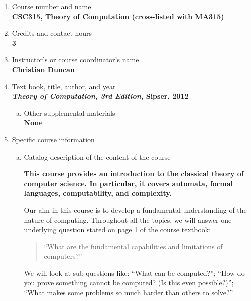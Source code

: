 \label{CSC315}  %
\begin{enumerate}[1.]
\item Course number and name\\
  {\bfseries
    CSC315, Theory of Computation (cross-listed with MA315)
  }
  
\item Credits and contact hours\\
  {\bfseries
    3    
  }

\item Instructor's or course coordinator's name\\
  {\bfseries
    Christian Duncan    
  }

\item Text book, title, author, and year\\
  {\bfseries
    {\em Theory of Computation, 3rd Edition}, Sipser, 2012
  }
\begin{enumerate}[a.]
\item Other supplemental materials\\
  {\bfseries
    None    
  }
\end{enumerate}

\item Specific course information
\begin{enumerate}[a.]  
\item Catalog description of the content of the course\\
  {\bfseries
This course provides an introduction to the classical theory of computer science.
In particular, it covers automata, formal languages, computability, and complexity.

Our aim in this course is to develop a fundamental understanding of the nature of computing.
Throughout all the topics, we will answer one underlying question stated on page 1 of the course textbook:
\begin{quote}
``What are the fundamental capabilities and limitations of computers?''
\end{quote}
We will look at sub-questions like: ``What can be computed?''; ``How do you prove something
cannot be computed?  (Is this even possible?)''; ``What makes some problems so much harder
than others to solve?''
  }


\end{enumerate}
\end{enumerate}
